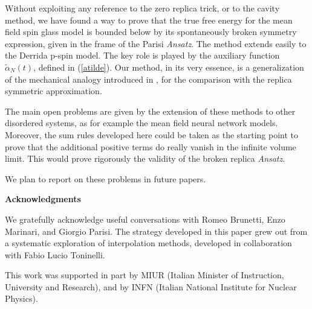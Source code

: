 \documentclass[a4paper,12pt]{article}
\begin{document}
Without exploiting any reference to the zero replica trick, or to the 
cavity method, we have found a way to prove that the true free energy for the 
mean field spin glass model is bounded below by its spontaneously broken symmetry 
expression, given in the frame of the Parisi {\sl Ansatz}. The method 
extends easily to the Derrida p-spin model. The key role is played by the 
auxiliary function $\tilde\alpha_N(t)$, defined in (\ref{atilde}). Our method, 
in its very essence, is a generalization of the mechanical analogy 
introduced in \cite{Gsum}, for the comparison with the replica symmetric 
approximation.

The main open problems are given by the extension of these methods to 
other disordered systems, as for example the mean field neural network models.
Moreover, the sum rules developed here could be taken as the starting 
point to prove that the additional positive terms do really vanish in the 
infinite volume limit. This would prove rigorously the validity of the 
broken replica {\sl Ansatz}.

We plan to report on these problems in future papers.

\vspace{.5cm}
{\bf Acknowledgments}

We gratefully acknowledge useful conversations with
Romeo Brunetti, Enzo Marinari, and 
Giorgio Parisi. The strategy developed in this paper grew out from a 
systematic exploration of interpolation methods, developed in 
collaboration with Fabio Lucio Toninelli.

This work was supported in part by MIUR 
(Italian Minister of Instruction, University and Research), 
and by INFN (Italian National Institute for Nuclear Physics).
\end{document}
